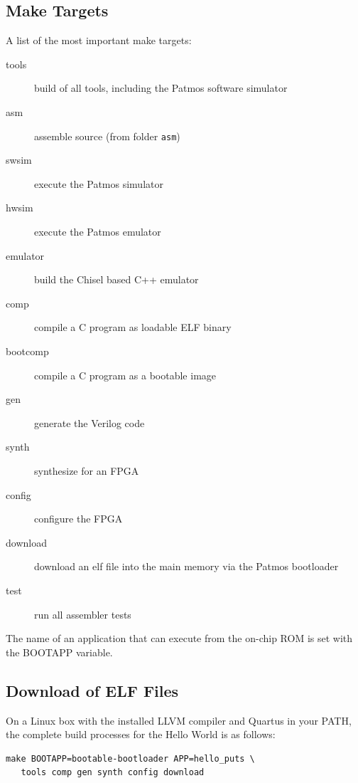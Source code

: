\documentclass[a4paper,fontsize=10pt,twoside,DIV15,BCOR12mm,headinclude=true,footinclude=false,pagesize,bibtotoc]{scrbook}
\newcommand{\code}[1]{{\texttt{#1}}}
\newcommand{\comment}[3]{

\textsf{\textbf{#1}} {\color{#3}#2}}
\newcommand{\martin}[1]{\comment{Martin}{#1}{Blue}}
\renewcommand{\martin}[1]{}
\begin{document}
\martin{I'm still a little bit confused when to use the APP and the BOOTAPP
thing.}

\martin{TODO: we need to streamline the make process a little bit.
The targets might be a little bit confusing. Patmos is compiled two times.}


\subsection{Make Targets}

A list of the most important make targets:

\begin{description}
\item[tools] build of all tools, including the Patmos software simulator
\item[asm] assemble source (from folder \code{asm})
\item[swsim] execute the Patmos simulator
\item[hwsim] execute the Patmos emulator
\item[emulator] build the Chisel based C++ emulator
\item[comp] compile a C program as loadable ELF binary
\item[bootcomp] compile a C program as a bootable image
\item[gen] generate the Verilog code
\item[synth] synthesize for an FPGA
\item[config] configure the FPGA
\item[download] download an elf file into the main memory via the Patmos bootloader
\item[test] run all assembler tests 
\end{description}

The name of an application that can execute from the on-chip ROM is set
with the BOOTAPP variable.

\subsection{Download of ELF Files}
\label{sec:elf:files}

On a Linux box with the installed LLVM compiler and Quartus in your PATH,
the complete build processes for the Hello World is as follows:

\begin{verbatim}
make BOOTAPP=bootable-bootloader APP=hello_puts \
   tools comp gen synth config download
\end{verbatim}
\end{document}
